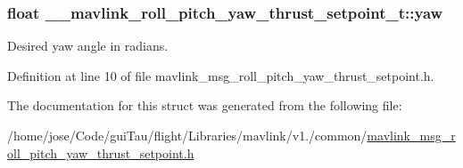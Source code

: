 \hypertarget{struct____mavlink__roll__pitch__yaw__thrust__setpoint__t_a4004dd45e067bbb256a1e5614d1d3e8a}{
\subsubsection[{yaw}]{\setlength{\rightskip}{0pt plus 5cm}float \-\_\-\-\_\-mavlink\-\_\-roll\-\_\-pitch\-\_\-yaw\-\_\-thrust\-\_\-setpoint\-\_\-t\-::yaw}}\label{struct____mavlink__roll__pitch__yaw__thrust__setpoint__t_a4004dd45e067bbb256a1e5614d1d3e8a}


Desired yaw angle in radians. 



Definition at line 10 of file mavlink\-\_\-msg\-\_\-roll\-\_\-pitch\-\_\-yaw\-\_\-thrust\-\_\-setpoint.\-h.



The documentation for this struct was generated from the following file\-:\begin{DoxyCompactItemize}
\item 
/home/jose/\-Code/gui\-Tau/flight/\-Libraries/mavlink/v1./common/\hyperlink{mavlink__msg__roll__pitch__yaw__thrust__setpoint_8h}{mavlink\-\_\-msg\-\_\-roll\-\_\-pitch\-\_\-yaw\-\_\-thrust\-\_\-setpoint.\-h}\end{DoxyCompactItemize}
